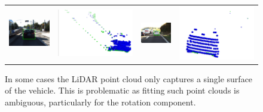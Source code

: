 \begin{figure}
    \centering
    \begin{tabular}{c c c c}
         \includegraphics[height=0.135\textwidth]{figures/method/ambiguous/ex4/rgb.png}
        &\includegraphics[height=0.135\textwidth]{figures/method/ambiguous/ex4/pcd.png} &
         \includegraphics[height=0.135\textwidth]{figures/method/ambiguous/ex6/rgb.png}
        &\includegraphics[height=0.135\textwidth]{figures/method/ambiguous/ex6/pcd.png}
    \end{tabular}
    \caption{In some cases the LiDAR point cloud only captures a single surface of the vehicle. This is problematic as fitting such point clouds is ambiguous, particularly for the rotation component.}\label{fig:ambiguous}
\end{figure}